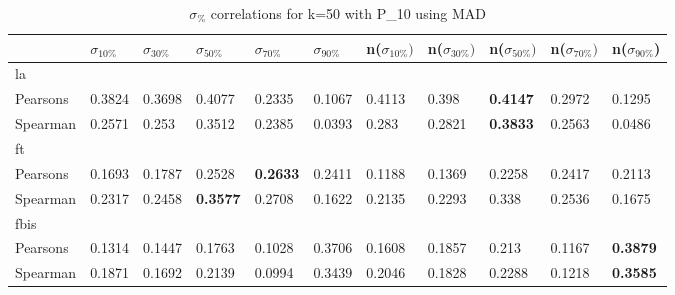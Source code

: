 \documentclass{sig-alternate}
\begin{document}
\begin{table}[h!]
\centering
\begin{tabular}{|l||l|l|l|l|l||l|l|l|l|l|}
\hline
& $\sigma_{10\%}$ & $\sigma_{30\%}$ & $\sigma_{50\%}$ & $\sigma_{70\%}$ & $\sigma_{90\%}$ & n($\sigma_{10\%})$ & n($\sigma_{30\%})$ & n($\sigma_{50\%})$ & n($\sigma_{70\%})$ & n($\sigma_{90\%}$) \\ \hline
\hline la &  &  &  &  &  &  &  &  &  &  \\ \hline
Pearsons & 0.3824 & 0.3698 & 0.4077 & 0.2335 & 0.1067 & 0.4113 & 0.398 & \textbf{0.4147} & 0.2972 & 0.1295 \\ \hline
Spearman & 0.2571 & 0.253 & 0.3512 & 0.2385 & 0.0393 & 0.283 & 0.2821 & \textbf{0.3833} & 0.2563 & 0.0486 \\ \hline
\hline ft &  &  &  &  &  &  &  &  &  &  \\ \hline
Pearsons & 0.1693 & 0.1787 & 0.2528 & \textbf{0.2633} & 0.2411 & 0.1188 & 0.1369 & 0.2258 & 0.2417 & 0.2113 \\ \hline
Spearman & 0.2317 & 0.2458 & \textbf{0.3577} & 0.2708 & 0.1622 & 0.2135 & 0.2293 & 0.338 & 0.2536 & 0.1675 \\ \hline
\hline fbis &  &  &  &  &  &  &  &  &  &  \\ \hline
Pearsons & 0.1314 & 0.1447 & 0.1763 & 0.1028 & 0.3706 & 0.1608 & 0.1857 & 0.213 & 0.1167 & \textbf{0.3879} \\ \hline
Spearman & 0.1871 & 0.1692 & 0.2139 & 0.0994 & 0.3439 & 0.2046 & 0.1828 & 0.2288 & 0.1218 & \textbf{0.3585} \\ \hline
\end{tabular}
\caption{$\sigma_{\%}$ correlations for k=50 with P\_10 using MAD}
\end{table}
\end{document}
